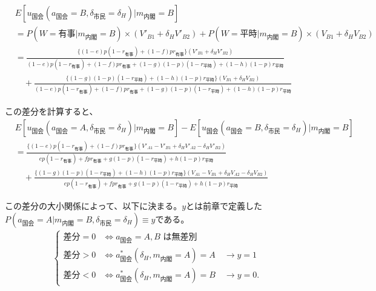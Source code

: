 \documentclass[main.tex]{subfiles}
\begin{document}
\begin{align*}
    & E[u_{国会}(a_{国会}=B, \delta_{市民}=\delta_H) | m_{内閣} = B  ]\\[0.5em]
    &= P(W=有事 | m_{内閣}=B) × (V'_{B1} + \delta_H V'_{B2}) + P(W=平時 | m_{内閣}=B) × (V_{B1} + \delta_H V_{B2})\\[0.5em]
    &= \frac{ \{(1-e)p(1-r_{有事}) +  (1-f)pr_{有事}\}(V'_{B1} + \delta_H V'_{B2})  }{ (1-e)p(1-r_{有事}) + (1-f)pr_{有事} + (1-g)(1-p)(1-r_{平時}) + (1-h)(1-p)r_{平時} }\\[1em]
    &\quad + \frac{ \{(1-g)(1-p)(1-r_{平時}) + (1-h)(1-p)r_{平時}\}(V_{B1} + \delta_H V_{B2}) }{ (1-e)p(1-r_{有事}) + (1-f)pr_{有事} + (1-g)(1-p)(1-r_{平時}) + (1-h)(1-p)r_{平時} }
\end{align*}

\bigskip
この差分を計算すると、
\begin{align*}
    & E[u_{国会}(a_{国会}=A, \delta_{市民}=\delta_H) | m_{内閣} = B  ] - E[u_{国会}(a_{国会}=B, \delta_{市民}=\delta_H) | m_{内閣} = B  ]\\[1em]
    &= \frac{ \{(1-e)p(1-r_{有事}) +  (1-f)pr_{有事}\}(V'_{A1} -V'_{B1} + \delta_H V'_{A2} - \delta_H V'_{B2})  }{ ep(1-r_{有事}) + fpr_{有事} + g(1-p)(1-r_{平時}) + h(1-p)r_{平時} }\\[1em]
    &\quad + \frac{ \{(1-g)(1-p)(1-r_{平時}) + (1-h)(1-p)r_{平時}\}(V_{A1} - V_{B1} + \delta_H V_{A2} - \delta_H V_{B2} ) }{ ep(1-r_{有事}) + fpr_{有事} + g(1-p)(1-r_{平時}) + h(1-p)r_{平時} }
\end{align*}

\bigskip
この差分の大小関係によって、以下に決まる。$y$とは前章で定義した\\
$P(a_{国会} = A| m_{内閣} = B, \delta_{市民} = \delta_H ) \equiv y$である。
\begin{align*}
    \begin{cases}
         \text{差分} = 0 &\Leftrightarrow \text{$a_{\text{国会}} = A, B$ は無差別} \\
         \text{差分} > 0 &\Leftrightarrow a^*_{\text{国会}}(\delta_H, m_{\text{内閣}} = A) = A \quad\rightarrow y = 1 \\
         \text{差分} < 0 &\Leftrightarrow a^*_{\text{国会}}(\delta_H, m_{\text{内閣}} = A) = B \quad\rightarrow y = 0.
    \end{cases}
\end{align*}


\theendnotes
\end{document}
